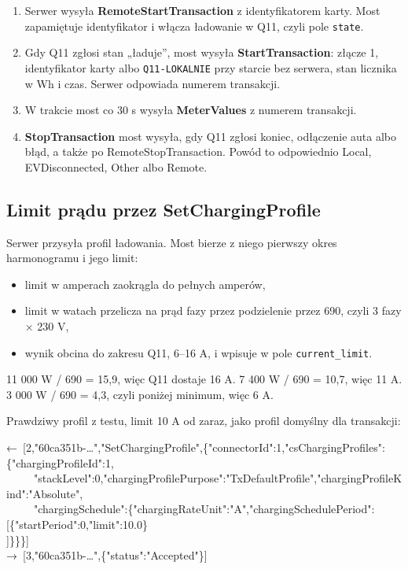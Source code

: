 \documentclass[11pt,a4paper]{article}
\begin{document}
\begin{enumerate}
\item Serwer wysyła \textbf{RemoteStartTransaction} z identyfikatorem karty. Most zapamiętuje identyfikator i włącza ładowanie w Q11, czyli pole \texttt{state}.
\item Gdy Q11 zgłosi stan „ładuje”, most wysyła \textbf{StartTransaction}: złącze 1, identyfikator karty albo \texttt{Q11-LOKALNIE} przy starcie bez serwera, stan licznika w Wh i czas. Serwer odpowiada numerem transakcji.
\item W trakcie most co 30 s wysyła \textbf{MeterValues} z numerem transakcji.
\item \textbf{StopTransaction} most wysyła, gdy Q11 zgłosi koniec, odłączenie auta albo błąd, a także po RemoteStopTransaction. Powód to odpowiednio Local, EVDisconnected, Other albo Remote.
\end{enumerate}

\subsection{Limit prądu przez SetChargingProfile}

Serwer przysyła profil ładowania. Most bierze z niego pierwszy okres harmonogramu i jego limit:

\begin{itemize}
\item limit w amperach zaokrągla do pełnych amperów,
\item limit w watach przelicza na prąd fazy przez podzielenie przez 690, czyli 3 fazy × 230 V,
\item wynik obcina do zakresu Q11, 6–16 A, i wpisuje w pole \texttt{current\_\allowbreak{}limit}.
\end{itemize}

\begin{przyklad}[{Przykład}]
11 000 W / 690 = 15,9, więc Q11 dostaje 16 A. 7 400 W / 690 = 10,7, więc 11 A. 3 000 W / 690 = 4,3, czyli poniżej minimum, więc 6 A.
\end{przyklad}

Prawdziwy profil z testu, limit 10 A od zaraz, jako profil domyślny dla transakcji:


\begin{kodbox}
{\symbolfont←}\ [2,"60ca351b-…","SetChargingProfile",\{"connectorId":1,"csChargingProfiles":\{"chargingProfileId":1,\\
\ \ \ \ \ "stackLevel":0,"chargingProfilePurpose":"TxDefaultProfile","chargingProfileKind":"Absolute",\\
\ \ \ \ \ "chargingSchedule":\{"chargingRateUnit":"A","chargingSchedulePeriod":[\{"startPeriod":0,"limit":10.0\}\\
\hspace*{1.2em}]\}\}\}]\\
{\symbolfont→}\ [3,"60ca351b-…",\{"status":"Accepted"\}]
\end{kodbox}
\end{document}
